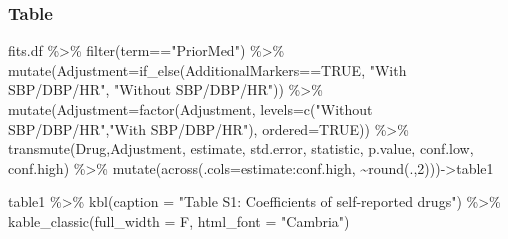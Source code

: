 \documentclass[
]{article}
\newenvironment{Shaded}{\begin{snugshade}}{\end{snugshade}}
\newcommand{\AttributeTok}[1]{\textcolor[rgb]{0.77,0.63,0.00}{#1}}
\newcommand{\ConstantTok}[1]{\textcolor[rgb]{0.00,0.00,0.00}{#1}}
\newcommand{\DecValTok}[1]{\textcolor[rgb]{0.00,0.00,0.81}{#1}}
\newcommand{\FunctionTok}[1]{\textcolor[rgb]{0.00,0.00,0.00}{#1}}
\newcommand{\NormalTok}[1]{#1}
\newcommand{\OtherTok}[1]{\textcolor[rgb]{0.56,0.35,0.01}{#1}}
\newcommand{\SpecialCharTok}[1]{\textcolor[rgb]{0.00,0.00,0.00}{#1}}
\newcommand{\StringTok}[1]{\textcolor[rgb]{0.31,0.60,0.02}{#1}}
\begin{document}
\hypertarget{table}{%
\subsubsection{Table}\label{table}}

\begin{Shaded}
\begin{Highlighting}[]
\NormalTok{fits.df  }\SpecialCharTok{\%\textgreater{}\%} 
  \FunctionTok{filter}\NormalTok{(term}\SpecialCharTok{==}\StringTok{"PriorMed"}\NormalTok{) }\SpecialCharTok{\%\textgreater{}\%} 
  \FunctionTok{mutate}\NormalTok{(}\AttributeTok{Adjustment=}\FunctionTok{if\_else}\NormalTok{(AdditionalMarkers}\SpecialCharTok{==}\ConstantTok{TRUE}\NormalTok{, }\StringTok{"With SBP/DBP/HR"}\NormalTok{, }\StringTok{"Without SBP/DBP/HR"}\NormalTok{)) }\SpecialCharTok{\%\textgreater{}\%} 
  \FunctionTok{mutate}\NormalTok{(}\AttributeTok{Adjustment=}\FunctionTok{factor}\NormalTok{(Adjustment, }\AttributeTok{levels=}\FunctionTok{c}\NormalTok{(}\StringTok{"Without SBP/DBP/HR"}\NormalTok{,}\StringTok{"With SBP/DBP/HR"}\NormalTok{), }\AttributeTok{ordered=}\ConstantTok{TRUE}\NormalTok{)) }\SpecialCharTok{\%\textgreater{}\%} 
  \FunctionTok{transmute}\NormalTok{(Drug,Adjustment, estimate, std.error, statistic, p.value, conf.low, conf.high) }\SpecialCharTok{\%\textgreater{}\%} 
  \FunctionTok{mutate}\NormalTok{(}\FunctionTok{across}\NormalTok{(}\AttributeTok{.cols=}\NormalTok{estimate}\SpecialCharTok{:}\NormalTok{conf.high, }\SpecialCharTok{\textasciitilde{}}\FunctionTok{round}\NormalTok{(.,}\DecValTok{2}\NormalTok{)))}\OtherTok{{-}\textgreater{}}\NormalTok{table1}
\end{Highlighting}
\end{Shaded}

\begin{Shaded}
\begin{Highlighting}[]
\NormalTok{table1 }\SpecialCharTok{\%\textgreater{}\%} 
  \FunctionTok{kbl}\NormalTok{(}\AttributeTok{caption =} \StringTok{"Table S1: Coefficients of self{-}reported drugs"}\NormalTok{) }\SpecialCharTok{\%\textgreater{}\%}
  \FunctionTok{kable\_classic}\NormalTok{(}\AttributeTok{full\_width =}\NormalTok{ F, }\AttributeTok{html\_font =} \StringTok{"Cambria"}\NormalTok{)}
\end{Highlighting}
\end{Shaded}
\end{document}
